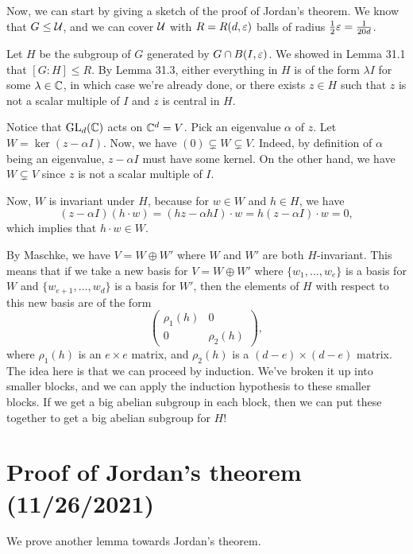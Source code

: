 Now, we can start by giving a sketch of the proof of Jordan's theorem. We know 
that $G \leq {\cal U}$, and we can cover ${\cal U}$ with $R = R(d, \varepsilon)$ balls
of radius $\frac12 \varepsilon = \frac{1}{20d}$. 

Let $H$ be the subgroup of $G$ generated by $G \cap B(I, \varepsilon)$. We showed in 
Lemma 31.1 that $[G : H] \leq R$. By Lemma 31.3, either everything in $H$ 
is of the form $\lambda I$ for some $\lambda \in \mathbb{C}$, in which case 
we're already done, or there exists $z \in H$ such that $z$ is not a 
scalar multiple of $I$ and $z$ is central in $H$. 

Notice that $\operatorname{GL}_d(\mathbb{C})$ acts on $\mathbb{C}^d = V$. Pick an eigenvalue $\alpha$ of $z$. 
Let $W = \ker(z - \alpha I)$. Now, we have $(0) \subsetneq W \subsetneq V$.
Indeed, by definition of $\alpha$ being an eigenvalue, $z - \alpha I$ must 
have some kernel. On the other hand, we have $W \subsetneq V$ since 
$z$ is not a scalar multiple of $I$. 

Now, $W$ is invariant under $H$, because for $w \in W$ and $h \in H$, we have 
\[ (z - \alpha I)(h \cdot w) = (hz - \alpha h I) \cdot w = h(z - \alpha I) 
\cdot w = 0, \] 
which implies that $h \cdot w \in W$. 

By Maschke, we have $V = W \oplus W'$ where $W$ and $W'$ are both $H$-invariant. 
This means that if we take a new basis for $V = W \oplus W'$ where 
$\{w_1, \dots, w_e\}$ is a basis for $W$ and $\{w_{e+1}, \dots, w_d\}$ is a 
basis for $W'$, then the elements of $H$ with respect to this new basis 
are of the form 
\[ \begin{pmatrix}
    \rho_1(h) & 0 \\ 
    0 & \rho_2(h)
\end{pmatrix}, \] 
where $\rho_1(h)$ is an $e\times e$ matrix, and $\rho_2(h)$ is a 
$(d-e)\times (d-e)$ matrix. The idea here is that we can proceed by 
induction. We've broken it up into smaller blocks, and we can apply the 
induction hypothesis to these smaller blocks. If we get a big abelian 
subgroup in each block, then we can put these together to get a big 
abelian subgroup for $H$!

\section{Proof of Jordan's theorem (11/26/2021)}
We prove another lemma towards Jordan's theorem. 

